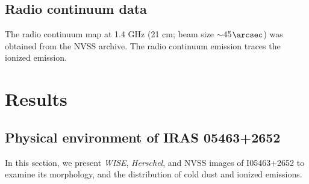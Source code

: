 \documentclass[iop]{emulateapj}
\begin{document}
\subsection{Radio continuum data}
%
The radio continuum map at 1.4 GHz (21 cm; beam size  $\sim$45$\arcsec$) was obtained from the NVSS archive.
The radio continuum emission traces the ionized emission.
%
\section{Results}
\label{sec:data}
%
\subsection{Physical environment of IRAS 05463+2652}
\label{subsec:u1}
%
In this section, we present {\it WISE}, {\it Herschel}, and NVSS images of I05463+2652 to examine its morphology, and 
the distribution of cold dust and ionized emissions.
\end{document}
